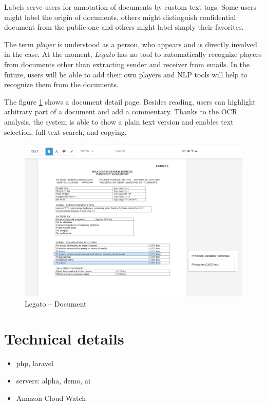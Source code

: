 \documentclass[
  digital, %
  table,   %
  lof,     %
  lot,     %
]{fithesis3}
\begin{document}
Labels serve users for annotation of documents by custom text tags.
Some users might label the origin of documents, others might distinguish confidential document from the public one and others might label simply their favorites.

The term \textit{player} is understood as a person, who appears and is directly involved in the case.
At the moment, \textit{Legato} has no tool to automatically recognize players from documents other than extracting sender and receiver from emails.
In the future, users will be able to add their own players and NLP tools will help to recognize them from the documents.

The figure \ref{fig:legato_document} shows a document detail page.
Besides reading, users can highlight arbitrary part of a document and add a commentary.
Thanks to the OCR analysis, the system is able to show a plain text version and enables text selection, full-text search, and copying.


\begin{figure}[h]
\caption{Legato -- Document}
\label{fig:legato_document}
\includegraphics[width=\textwidth]{img/Legato-File}
\end{figure}

\section{Technical details}

\begin{itemize}
\item php, laravel
\item servers: alpha, demo, ai
\item Amazon Cloud Watch
\end{itemize}
\end{document}
